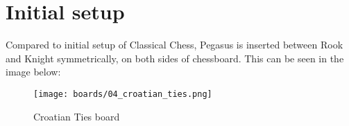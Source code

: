 \clearpage %

\section*{Initial setup}
\label{sec:Croatian Ties/Initial setup}

Compared to initial setup of Classical Chess, Pegasus is inserted between Rook and Knight
symmetrically, on both sides of chessboard. This can be seen in the image below:

\noindent
\begin{figure}[h]
\texttt{[image: boards/04\_croatian\_ties.png]}
\caption{Croatian Ties board}
\label{fig:04_croatian_ties}
\end{figure}

\clearpage %
